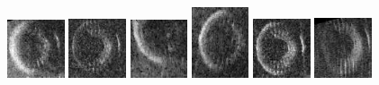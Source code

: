 \begin{figure}
    \includegraphics[width=0.15\textwidth]{chapters/images/dataset/all-class-images/tire/tire-182.jpg}
    \includegraphics[width=0.15\textwidth]{chapters/images/dataset/all-class-images/tire/tire-245.jpg}
    \includegraphics[width=0.15\textwidth]{chapters/images/dataset/all-class-images/tire/tire-61.jpg}
    \includegraphics[width=0.15\textwidth]{chapters/images/dataset/all-class-images/tire/tire-94.jpg}
    \includegraphics[width=0.15\textwidth]{chapters/images/dataset/all-class-images/tire/tire-263.jpg}
    \includegraphics[width=0.15\textwidth]{chapters/images/dataset/all-class-images/tire/tire-114.jpg}
    

\end{figure}
